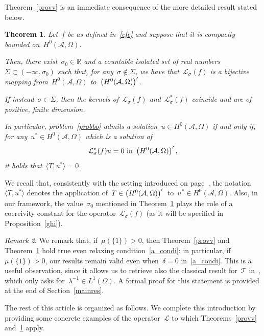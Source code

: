\documentclass[11pt,hyp,]{nyjm}
\numberwithin{equation}{section}
\newcommand{\R}{\mathbb{R}}
\newtheorem{theorem}{Theorem}[section]
\theoremstyle{remark}
\newtheorem{remark}[theorem]{Remark}
\newcommand{\am}{\mathcal{A}}
\begin{document}
Theorem~\ref{provv} is an immediate consequence of the more detailed result stated below.
          
\begin{theorem}\label{freddi}
Let~$f$ be as defined in~\eqref{efe} and suppose that it is compactly bounded on~$H^0(\am, \Omega)$.

Then, there exist~$\sigma_0\in\R$ and a countable isolated set of real numbers~$\Sigma \subset (- \infty,\sigma_0 )$ such that, for any~${\sigma} \notin \Sigma$, we have that~$ \mathcal{L}_{{\sigma}}(f)$ is a bijective mapping from~$H^0(\am, \Omega)$ to~$\left( H^0(\am, \Omega) \right)\rq{}$. 

If instead~${\sigma} \in \Sigma$, then the kernels of~$ \mathcal{L}_{{\sigma}}(f)$ and~$ \mathcal{L}^*_{{\sigma}}(f)$ coincide and are of positive, finite dimension.

In particular, problem~\eqref{probbo} admits a solution~$u \in H^0(\mathcal{A}, \Omega)$ if and only if, for any~$u^*\in H^0(\mathcal{A}, \Omega)$ which is a solution of
\begin{equation*}
\mathcal{L}^*_{\sigma}(f) u = 0 \mbox{ in } \left( H^0(\mathcal{A}, \Omega)\right)\rq{},
\end{equation*}
it holds that~$\langle T, u^* \rangle =0$.
\end{theorem}

{W}e recall that, consistently with the setting
introduced on page~\pageref{miwfh:302rtojgFWSa},
the notation~$\langle T, u^* \rangle $ denotes the application of~$T\in\left(H^0(\mathcal{A}, \Omega )\right)\rq{}$ to~$u^*\in H^0(\mathcal{A}, \Omega )$. Also,
in our framework,
the value~$\sigma_0$ mentioned in Theorem~\ref{freddi} plays the role of a coercivity constant for the operator~$\mathcal{L}_{\sigma}(f)$ (as it will be specified in Proposition~\ref{ghi}).  
\begin{remark} \label{remi}
We remark that, if~$\mu(\{1\})>0$, then Theorem~\ref{provv} and Theorem~\ref{freddi} hold true even relaxing condition~\eqref{a_condi}: in particular, 
if~$\mu(\{1\})>0$, our results remain valid even when~$\delta=0$
in~\eqref{a_condi}. This is a useful observation, since it allows us to retrieve also the
classical result for~$\mathcal{T}$ in~\cite{trudinger}, which only asks for~$ \lambda^{-1} \in L^1(\Omega)$. A formal proof for this statement is provided at the end of Section~\ref{mainres}.  
\end{remark}

{T}he rest of this article is organized as follows. We complete this introduction by providing some concrete examples of the operator~$\mathcal{L}$ to which Theorems~\ref{provv} and~\ref{freddi} apply.
\end{document}
